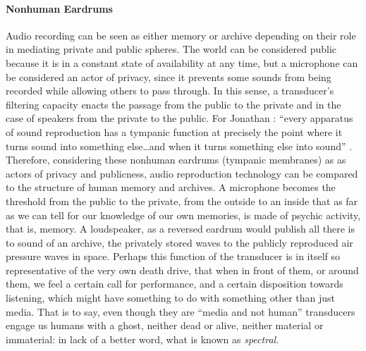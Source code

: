 \paragraph{Nonhuman Eardrums}
Audio recording can be seen as either memory or archive depending on their role in mediating private and public spheres. The world can be considered public because it is in a constant state of availability at any time, but a microphone can be considered an actor of privacy, since it prevents some sounds from being recorded while allowing others to pass through. In this sense, a transducer's filtering capacity enacts the passage from the public to the private and in the case of speakers from the private to the public. For Jonathan \textcite{Ste03:Aud}: ``every apparatus of sound reproduction has a tympanic function at precisely the point where it turns sound into something else\dots and when it turns something else into sound'' \parencite[34]{Ste03:Aud}. Therefore, considering these nonhuman eardrums (tympanic membranes) as as actors of privacy and publicness, audio reproduction technology can be compared to the structure of human memory and archives. A microphone becomes the threshold from the public to the private, from the outside to an inside that as far as we can tell for our knowledge of our own memories, is made of psychic activity, that is, memory. A loudspeaker, as a reversed eardrum would publish all there is to sound of an archive, the privately stored waves to the publicly reproduced air pressure waves in space. Perhaps this function of the transducer is in itself so representative of the very own death drive, that when in front of them, or around them, we feel a certain call for performance, and a certain disposition towards listening, which might have something to do with something other than just media. That is to say, even though they are ``media and not human'' transducers engage us humans with a ghost, neither dead or alive, neither material or immaterial: in lack of a better word, what is known as \textit{spectral}. 


